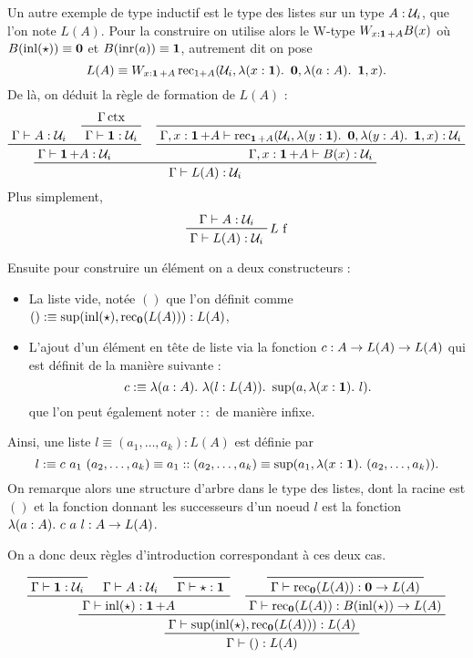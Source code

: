 \documentclass[../../rapport.tex]{subfiles}
\begin{document}
  Un autre exemple de type inductif est le type des listes sur un type $A : \mathcal U_i$, que l'on note $L(A)$.
  Pour la construire on utilise alors le W-type $W_{x:\operatorname{\textbf{1}}+A}B(x)$ où $B(\operatorname{inl}(\star)) \equiv \operatorname{\textbf{0}}$ et $B(\operatorname{inr}(a)) \equiv \operatorname{\textbf{1}}$,
  autrement dit on pose
  $$L(A) \equiv W_{x:\operatorname{\textbf{1}} + A}\operatorname{rec}_{1+A}(\mathcal U_i, \lambda(x : \operatorname{\textbf{1}}).\ \operatorname{\textbf{0}}, \lambda(a : A).\ \operatorname{\textbf{1}}, x).$$
  De là, on déduit la règle de formation de $L(A)$ :
  $$
  \prfinterspace=1.2em
  \prftree
    {
      \prftree
	{\Gamma \vdash A : \U_i}
	{\prftree{\Gamma \ctx}{\Gamma \vdash \1 : \U_i}}
	  {\Gamma \vdash \1 + A : \U_i}
    }
    {
      \prftree
	{\prfaxiom{\Gamma, x : \1 + A \vdash \rec_{\1+A}(\U_i, \lambda(y : \1).\ \0, \lambda(y : A).\ \1, x) : \U_i}}
	{\Gamma, x : \1 + A \vdash B(x) : \U_i}
    }
      {\Gamma \vdash L(A) : \U_i}
  $$
  Plus simplement,
  $$
  \prftree[r]{$L$ f}{\Gamma \vdash A : \U_i}{\Gamma \vdash L(A) : \U_i}
  $$

  Ensuite pour construire un élément on a deux constructeurs :
  \begin{itemize}
    \item La liste vide, notée $()$ que l'on définit comme $() :\equiv \sup(\operatorname{inl}(\star), \operatorname{rec}_{\operatorname{\textbf{0}}}(L(A))) : L(A)$,
    \item L'ajout d'un élément en tête de liste via la fonction $c : A \rightarrow L(A) \rightarrow L(A)$ qui est définit de la manière suivante :
      $$c :\equiv \lambda(a : A).\ \lambda(l : L(A)).\ \sup(a, \lambda(x : \1).\ l).$$
      que l'on peut également noter $::$ de manière infixe.
  \end{itemize}
  Ainsi, une liste $l \equiv (a_1, \hdots, a_k) : L(A)$ est définie par
  $$l :\equiv c\ a_1\ (a_2, \hdots, a_k) \equiv a_1 :: (a_2, \hdots, a_k) \equiv \sup(a_1, \lambda(x : \operatorname{\textbf{1}}).\ (a_2, \hdots, a_k)).$$
  On remarque alors une structure d'arbre dans le type des listes, dont la racine est $()$
  et la fonction donnant les successeurs d'un noeud $l$ est la fonction $\lambda(a:A).\ c\ a\ l : A \rightarrow L(A)$.

  On a donc deux règles d'introduction correspondant à ces deux cas.

  $$
  \prfinterspace=1.2em
  \prftree
    {\prftree
      {\prftree
	{\prfaxiom{\Gamma \vdash \1 : \U_i}}
	{\Gamma \vdash A : \U_i}
	{\prfaxiom{\Gamma \vdash \star : \1}}
      {\Gamma \vdash \inl(\star) : \1 + A}}
      {\prftree
	{\prfaxiom{\Gamma \vdash \rec_{\0}(L(A)) : \0 \fun L(A)}}
      {\Gamma\vdash \rec_{\0}(L(A)) : B(\inl(\star)) \fun L(A)}}
    {\Gamma \vdash \sup(\inl(\star), \rec_{\0}(L(A))) : L(A)}}
  {\Gamma \vdash () : L(A)}
  $$
\end{document}

